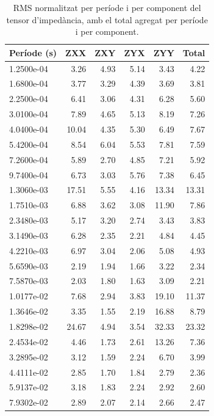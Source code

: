 \begin{table}[htbp]
  \centering
  \caption{RMS normalitzat per període i per component del tensor d'impedància, amb el total agregat per període i per component.}
  \label{tab:rms_period}
  \begin{tabular}{lrrrrr}
    \toprule
    Període (s) & ZXX & ZXY & ZYX & ZYY & \textbf{Total} \\
    \midrule
    1.2500e-04 & 3.26 & 4.93 & 5.14 & 3.43 & 4.22 \\
    1.6800e-04 & 3.77 & 3.29 & 4.39 & 3.69 & 3.81 \\
    2.2500e-04 & 6.41 & 3.06 & 4.31 & 6.28 & 5.60 \\
    3.0100e-04 & 7.89 & 4.65 & 5.13 & 8.19 & 7.26 \\
    4.0400e-04 & 10.04 & 4.35 & 5.30 & 6.49 & 7.67 \\
    5.4200e-04 & 8.54 & 6.04 & 5.53 & 7.81 & 7.59 \\
    7.2600e-04 & 5.89 & 2.70 & 4.85 & 7.21 & 5.92 \\
    9.7400e-04 & 6.73 & 3.03 & 5.76 & 7.38 & 6.45 \\
    1.3060e-03 & 17.51 & 5.55 & 4.16 & 13.34 & 13.31 \\
    1.7510e-03 & 6.88 & 3.62 & 3.08 & 11.90 & 7.86 \\
    2.3480e-03 & 5.17 & 3.20 & 2.74 & 3.43 & 3.83 \\
    3.1490e-03 & 6.28 & 2.35 & 2.21 & 4.84 & 4.45 \\
    4.2210e-03 & 6.97 & 3.04 & 2.06 & 5.08 & 4.93 \\
    5.6590e-03 & 2.19 & 1.94 & 1.66 & 3.22 & 2.34 \\
    7.5870e-03 & 2.03 & 1.80 & 1.63 & 3.09 & 2.21 \\
    1.0177e-02 & 7.68 & 2.94 & 3.83 & 19.10 & 11.37 \\
    1.3646e-02 & 3.35 & 1.55 & 2.19 & 16.88 & 8.79 \\
    1.8298e-02 & 24.67 & 4.94 & 3.54 & 32.33 & 23.32 \\
    2.4534e-02 & 4.46 & 1.73 & 2.61 & 13.26 & 7.36 \\
    3.2895e-02 & 3.12 & 1.59 & 2.24 & 6.70 & 3.99 \\
    4.4111e-02 & 2.85 & 1.70 & 1.84 & 2.79 & 2.36 \\
    5.9137e-02 & 3.18 & 1.83 & 2.24 & 2.92 & 2.60 \\
    7.9302e-02 & 2.89 & 2.07 & 2.14 & 2.66 & 2.47 \\

\end{tabular}
\end{table}
